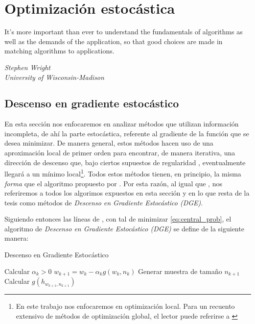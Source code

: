 \documentclass{book}
\theoremstyle{plain}
\theoremstyle{definition}
\theoremstyle{remark}
\begin{document}
\chapter{Optimización estocástica}

\epigraph{It’s more important than ever to understand the fundamentals of
algorithms as well as the demands of the application, so that good
choices are made in matching algorithms to applications.}{\textit{Stephen Wright \\ University of Wisconsin-Madison}}
\newpage

\section{Descenso en gradiente estocástico}

En esta sección nos enfocaremos en analizar métodos que utilizan información incompleta, de ahí la parte estocástica, referente al gradiente de la función que se desea minimizar. De manera general, estos métodos hacen uso de una aproximación local de primer orden para encontrar, de manera iterativa, una dirección de descenso que, bajo ciertos supuestos de regularidad \cite{NOCEDAL}, eventualmente llegará a un mínimo local\footnote{En este trabajo nos enfocaremos en optimización local. Para un recuento extensivo de métodos de optimización global, el lector puede referirse a \cite{TORN}}. Todos estos métodos tienen, en principio, la misma \emph{forma} que el algoritmo propuesto por \cite{ROBBINS}. Por esta razón, al igual que \cite{BOTTOU}, nos referiremos a todos los algorimos expuestos en esta sección y en lo que resta de la tesis como métodos de \emph{Descenso en Gradiente Estocástico (DGE)}.

Siguiendo entonces las líneas de \cite{BOTTOU}, con tal de minimizar \ref{eq:central_prob}, el algoritmo de \emph{Descenso en Gradiente Estocástico (DGE)} se define de la siguiente manera:

 \begin{algorithm}
   \caption{Descenso en Gradiente Estocástico}
    \begin{algorithmic}[1]
        \State Calcular $\alpha_k > 0$
        \State $w_{k+1} = w_k - \alpha_kg(w_k, n_k)$
        \State Generar muestra de tamaño $n_{k+1}$
        \State Calcular $g(h_{w_{k+1}, n_{k+1}})$
        \EndWhile
       \EndFunction
\end{algorithmic}
\end{algorithm}
\end{document}
